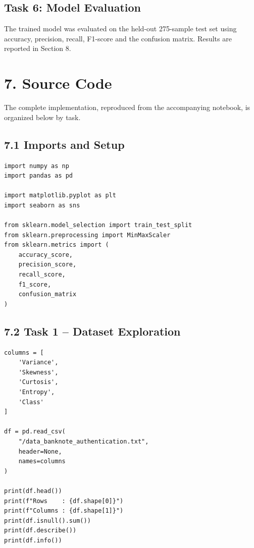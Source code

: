 \documentclass[11pt]{article}
\begin{document}
\subsection*{Task 6: Model Evaluation}
The trained model was evaluated on the held-out 275-sample test set using accuracy, precision, recall, F1-score and the confusion matrix. Results are reported in Section 8.

\section*{7. Source Code}

The complete implementation, reproduced from the accompanying notebook, is organized below by task.

\subsection*{7.1 Imports and Setup}
\begin{lstlisting}
import numpy as np
import pandas as pd

import matplotlib.pyplot as plt
import seaborn as sns

from sklearn.model_selection import train_test_split
from sklearn.preprocessing import MinMaxScaler
from sklearn.metrics import (
    accuracy_score,
    precision_score,
    recall_score,
    f1_score,
    confusion_matrix
)
\end{lstlisting}

\subsection*{7.2 Task 1 -- Dataset Exploration}
\begin{lstlisting}
columns = [
    'Variance',
    'Skewness',
    'Curtosis',
    'Entropy',
    'Class'
]

df = pd.read_csv(
    "/data_banknote_authentication.txt",
    header=None,
    names=columns
)

print(df.head())
print(f"Rows    : {df.shape[0]}")
print(f"Columns : {df.shape[1]}")
print(df.isnull().sum())
print(df.describe())
print(df.info())
\end{lstlisting}
\end{document}
